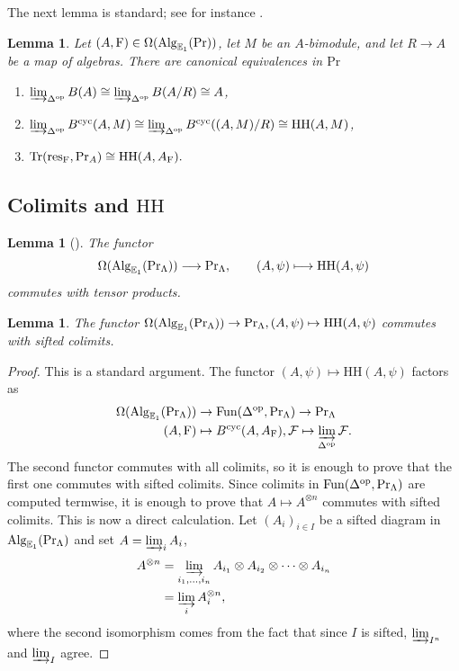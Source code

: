 \documentclass[a4paper, 10pt, oneside, reqno]{amsart}
\theoremstyle{plain}
\newtheorem{lem}[thm]{Lemma}
\theoremstyle{definition}
\theoremstyle{remark}
\newcommand{\opp}{\mathrm{op}}
\newcommand{\HHH}{\mathrm{HH}}
\newcommand{\Prr}{\mathrm{Pr}}
\newcommand{\E}{\mathbb{E}}
\newcommand{\cyc}{\mathrm{cyc}}
\newcommand{\Fcal}{\mathcal{F}}
\newcommand{\restr}{\mathrm{res}}
\begin{document}
The next lemma is standard; see for instance \cite[Section 3.6]{ToyModel}.

\begin{lem}\label{lem:trace-is-computed-via-HH}
Let $(A, \Frob) \in \Omega(\Alg_{\E_1}(\Prr))$, let $M$ be an $A$-bimodule, and let $R\to A$ be a map of algebras. There are canonical equivalences in $\Prr$ 
\begin{enumerate}
\item $\varinjlim_{\Delta^{\opp}} B(A) \cong \varinjlim_{\Delta^{\opp}} B(A/R) \cong A$,
\item $\varinjlim_{\Delta^{\opp}} B^{\cyc}(A,M) \cong \varinjlim_{\Delta^{\opp}} B^{\cyc}((A,M)/R) \cong \HHH(A,M)$,
\item $\Tr(\restr_{\Frob}, \Prr_A) \cong \HHH(A, A_{\Frob}).$
\end{enumerate}
\end{lem}

\subsection{Colimits and $\HHH$}

\begin{lem}[]\label{lem:hh-is-symmetric-monoidal}
The functor
\[
\Omega(\Alg_{\E_1}(\Prr_{\Lambda})) \longrightarrow \Prr_{\Lambda},
\qquad (A,\psi) \longmapsto \HHH(A,\psi)
\]
commutes with tensor products.
\end{lem}

\begin{lem}\label{lem:commutation-trace-sifted-colimits}
The functor $\Omega(\Alg_{\E_1}(\Prr_{\Lambda})) \to \Prr_{\Lambda}, (A, \psi) \mapsto \HHH(A, \psi)$ commutes with sifted colimits. 
\end{lem}

\begin{proof}
This is a standard argument. The functor $(A, \psi) \mapsto \HHH(A, \psi)$ factors as 
\begin{align*}
\Omega(\Alg_{\E_1}(\Prr_{\Lambda})) &\rightarrow \Fun(\Delta^{\opp}, \Prr_{\Lambda}) \to \Prr_{\Lambda} \\
(A, \Frob) &\mapsto B^{\cyc}(A, A_{\Frob}),  \Fcal \mapsto \varinjlim_{\Delta^{\opp}} \Fcal.
\end{align*}
The second functor commutes with all colimits, so it is enough to prove that the first one commutes with sifted colimits. Since colimits in $\Fun(\Delta^{\opp}, \Prr_{\Lambda})$ are computed termwise, it is enough to prove that $A \mapsto A^{\otimes n}$ commutes with sifted colimits. This is now a direct calculation. Let $(A_i)_{i\in I}$ be a sifted diagram in $\Alg_{\E_1}(\Prr_{\Lambda})$ and set $A = \varinjlim_i A_i$,
\begin{align*}
A^{\otimes n} &= \varinjlim_{i_1, \dots, i_n} A_{i_1} \otimes A_{i_2} \otimes \dots \otimes A_{i_n} \\
&= \varinjlim_{i} A_{i}^{\otimes n},
\end{align*}
where the second isomorphism comes from the fact that since $I$ is sifted, $\varinjlim_{I^n}$ and $\varinjlim_{I}$ agree.
\end{proof}
\end{document}
